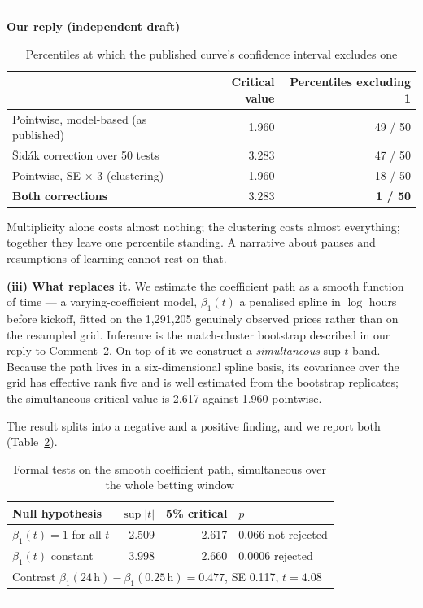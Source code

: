 \documentclass[letterpaper,12pt]{article}
\newcounter{b}
\newenvironment{ourreply}
  {\par\medskip\noindent\textcolor{ourcol}{\rule{\linewidth}{1pt}}%
   \par\nobreak\vspace{3pt}%
   \noindent\textbf{\textcolor{ourcol}{Our reply (independent draft)}}%
   \par\nobreak\vspace{3pt}}
  {\par\vspace{3pt}%
   \noindent\textcolor{ourcol}{\rule{\linewidth}{0.4pt}}\par\medskip}
\begin{document}
\begin{enumerate}
\begin{ourreply}
\begin{table}[h]
\centering
\caption{Percentiles at which the published curve's confidence interval
excludes one}
\label{tab:r1c7b}
\small
\begin{tabular}{lrr}
\toprule
 & Critical value & Percentiles excluding 1 \\
\midrule
Pointwise, model-based (as published) & 1.960 & 49 / 50 \\
Šidák correction over 50 tests        & 3.283 & 47 / 50 \\
Pointwise, SE $\times$ 3 (clustering) & 1.960 & 18 / 50 \\
\textbf{Both corrections}             & 3.283 & \textbf{1 / 50} \\
\bottomrule
\end{tabular}
\end{table}

Multiplicity alone costs almost nothing; the clustering costs almost
everything; together they leave one percentile standing. A narrative about
pauses and resumptions of learning cannot rest on that.

\textbf{(iii) What replaces it.} We estimate the coefficient path as a smooth
function of time --- a varying-coefficient model, $\beta_1(t)$ a penalised
spline in $\log$ hours before kickoff, fitted on the 1{,}291{,}205 genuinely
observed prices rather than on the resampled grid. Inference is the
match-cluster bootstrap described in our reply to Comment~2. On top of it we
construct a \emph{simultaneous} sup-$t$ band. Because the path lives in a
six-dimensional spline basis, its covariance over the grid has effective rank
five and is well estimated from the bootstrap replicates; the simultaneous
critical value is 2.617 against 1.960 pointwise.

The result splits into a negative and a positive finding, and we report both
(Table~\ref{tab:r1c7c}).

\begin{table}[h]
\centering
\caption{Formal tests on the smooth coefficient path, simultaneous over the
whole betting window}
\label{tab:r1c7c}
\small
\begin{tabular}{lrrl}
\toprule
Null hypothesis & $\sup|t|$ & 5\% critical & $p$ \\
\midrule
$\beta_1(t) = 1$ for all $t$ & 2.509 & 2.617 & 0.066 \quad not rejected \\
$\beta_1(t)$ constant        & 3.998 & 2.660 & 0.0006 \quad rejected \\
\midrule
\multicolumn{4}{l}{Contrast $\beta_1(24\,\text{h}) - \beta_1(0.25\,\text{h}) = 0.477$, \quad SE 0.117, \quad $t = 4.08$} \\
\bottomrule
\end{tabular}
\end{table}


\end{ourreply}
\end{enumerate}
\end{document}
